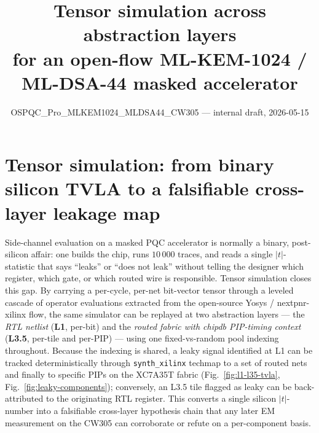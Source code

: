 \documentclass[10pt,a4paper]{article}
\title{\textbf{Tensor simulation across abstraction layers \\[2pt]
       for an open-flow ML-KEM-1024 / ML-DSA-44 masked accelerator}}
\author{OSPQC\_Pro\_MLKEM1024\_MLDSA44\_CW305 --- internal draft, 2026-05-15}
\date{}
\begin{document}
\maketitle
\thispagestyle{empty}

\section*{Tensor simulation: from binary silicon TVLA to a falsifiable
cross-layer leakage map}

Side-channel evaluation on a masked PQC accelerator is normally a binary,
post-silicon affair: one builds the chip, runs $10\,000$ traces, and reads a
single $|t|$-statistic that says ``leaks'' or ``does not leak'' without
telling the designer which register, which gate, or which routed wire is
responsible.  Tensor simulation closes this gap.  By carrying a per-cycle,
per-net bit-vector tensor through a leveled cascade of operator evaluations
extracted from the open-source Yosys / nextpnr-xilinx flow, the same
simulator can be replayed at two abstraction layers --- the \emph{RTL
netlist} (\textbf{L1}, per-bit) and the \emph{routed fabric with chipdb
PIP-timing context} (\textbf{L3.5}, per-tile and per-PIP) --- using one
fixed-vs-random pool indexing throughout.  Because the indexing is shared, a
leaky signal identified at L1 can be tracked deterministically through
\texttt{synth\_xilinx} techmap to a set of routed nets and finally to
specific PIPs on the XC7A35T fabric (Fig.~\ref{fig:l1-l35-tvla},
Fig.~\ref{fig:leaky-components}); conversely, an L3.5 tile flagged as leaky
can be back-attributed to the originating RTL register.  This converts a
single silicon $|t|$-number into a falsifiable cross-layer hypothesis chain
that any later EM measurement on the CW305 can corroborate or refute on a
per-component basis.
\end{document}
